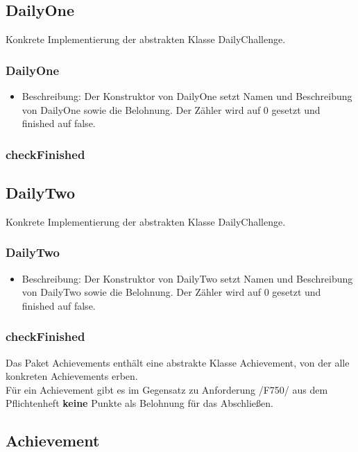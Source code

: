 \documentclass[a4paper]{scrreprt}
\begin{document}
	\subsection{DailyOne}
	Konkrete Implementierung der abstrakten Klasse DailyChallenge.
	\subsubsection{DailyOne}
	\begin{itemize}
		\item Beschreibung: Der Konstruktor von DailyOne setzt Namen und Beschreibung von DailyOne sowie die Belohnung. Der Zähler wird auf 0 gesetzt und finished auf false.
	\end{itemize}
	\subsubsection{checkFinished}
	
	\subsection{DailyTwo}
	Konkrete Implementierung der abstrakten Klasse DailyChallenge.
	\subsubsection{DailyTwo}
	\begin{itemize}
		\item Beschreibung: Der Konstruktor von DailyTwo setzt Namen und Beschreibung von DailyTwo sowie die Belohnung. Der Zähler wird auf 0 gesetzt und finished auf false.
	\end{itemize}
	\subsubsection{checkFinished}
	
	Das Paket Achievements enthält eine abstrakte Klasse Achievement, von der alle konkreten Achievements erben. \\
	Für ein Achievement gibt es im Gegensatz zu Anforderung /F750/ aus dem Pflichtenheft \textbf{keine} Punkte als Belohnung für das Abschließen.
	
	\subsection{Achievement}
\end{document}
